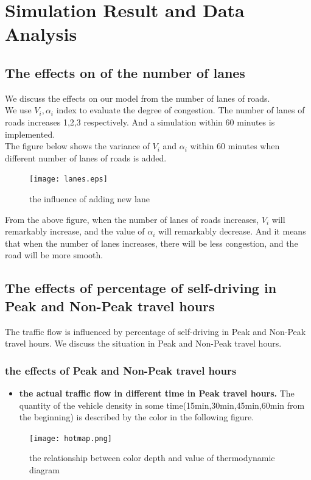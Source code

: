 \documentclass{mcmthesis}
\begin{document}
\section{Simulation Result and Data Analysis}
\subsection{The effects on of the number of lanes}
\label{lanes}
We discuss the effects on our model from the number of lanes of roads.\\
\indent We use $V_{i}, \alpha_{i}$ index to evaluate the degree of congestion. The number of lanes of roads increases 1,2,3 respectively. And a simulation within 60 minutes is implemented.\\
\indent The figure below shows the variance of $V_{i}$ and $\alpha_{i}$ within 60 minutes when different number of lanes of roads is added.\\
\begin{figure}[H]
	\centerline{\texttt{[image: lanes.eps]}}
	\caption{the influence of adding new lane}	
\end{figure}
\indent From the above figure, when the number of lanes of roads increases, $V_{i}$ will remarkably increase, and the value of $\alpha_{i}$ will remarkably decrease. And it means that when the number of lanes increases, there will be less congestion, and the road will be more smooth. \\
\subsection{The effects of percentage of self-driving in Peak and Non-Peak travel hours}
The traffic flow is influenced by percentage of self-driving in Peak and Non-Peak travel hours. We discuss the situation in Peak and Non-Peak travel hours. 
\subsubsection{the effects of Peak and Non-Peak travel hours}
\begin{itemize}
\item{\textbf{the actual traffic flow in different time in Peak travel hours.} The quantity of the vehicle density in some time(15min,30min,45min,60min from the beginning) is described by the color in the following figure. }
\end{itemize}
\begin{figure}[H]
	\centerline{\texttt{[image: hotmap.png]}}
	\caption{the relationship between color depth and value of thermodynamic diagram}	
\end{figure}
\end{document}
